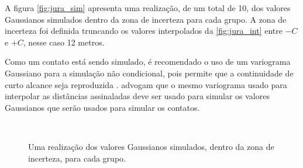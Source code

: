 A figura \autoref{fig:jura_sim} apresenta uma realização, de um total de 10, dos valores Gaussianos simulados dentro da zona de incerteza para cada grupo. A zona de incerteza foi definida truncando os valores interpolados da \autoref{fig:jura_int} entre $ -C $ e $ + C $, nesse caso 12 metros.

Como um contato está sendo simulado, é recomendado o uso de um variograma Gaussiano para a simulação não condicional, pois permite que a continuidade de curto alcance seja reproduzida \cite{wilde2012kriging}.  advogam que o mesmo variograma usado para interpolar as distâncias assinaladas deve ser usado para simular os valores Gaussianos que serão usados para simular os contatos.

\begin{figure}[H]
    \caption{Uma realização dos valores Gaussianos simulados, dentro da zona de incerteza, para cada grupo.} \label{fig:jura_sim}
     \centering
     \hspace{1em}
     \\

\end{figure}
